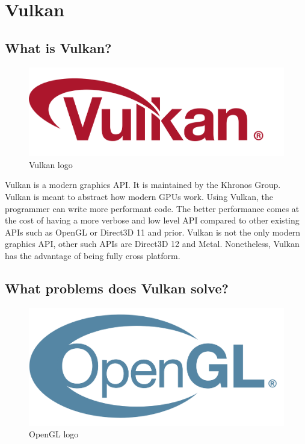 \chapter{Vulkan}

\section{What is Vulkan?}

\begin{figure}
    \begin{center}
        \includegraphics[scale=0.10]{images/VulkanLogo.png}
    \end{center}
    \caption{Vulkan logo}
    \label{fig:VulkanLogo}
\end{figure}

Vulkan is a modern graphics API. It is maintained by the Khronos Group.
Vulkan is meant to abstract how modern GPUs work.
Using Vulkan, the programmer can write more performant code.
The better performance comes at the cost of having a more verbose and low level API compared to
other existing APIs such as OpenGL or Direct3D 11 and prior.
Vulkan is not the only modern graphics API, other such APIs are Direct3D 12 and Metal.
Nonetheless, Vulkan has the advantage of being fully cross platform.

\section{What problems does Vulkan solve?}

\begin{figure}
    \begin{center}
        \includegraphics[scale=0.10]{images/OpenGLLogo.png}
    \end{center}
    \caption{OpenGL logo}
    \label{fig:OpenGLLogo}
\end{figure}

